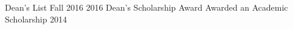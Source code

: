 \begin{cvhonors}
  \cvhonor
    {Dean's List}
    {Fall 2016}
    {}
    {2016}
  \cvhonor
    {Dean's Scholarship Award}
    {Awarded an Academic Scholarship}
    {}
    {2014}

\end{cvhonors}